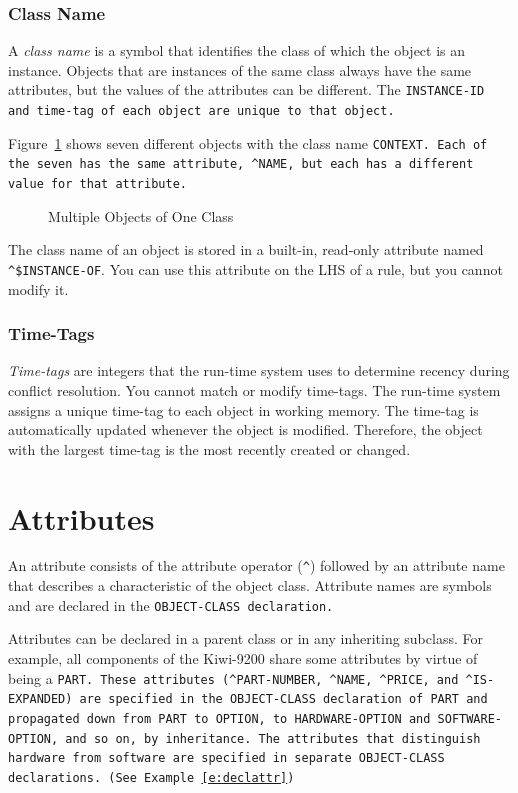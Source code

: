 \subsubsection*{Class Name}

A \emph{class name} is a symbol that identifies the class of which the
object is an instance. Objects that are instances of the same class
always have the same attributes, but the values of the attributes can
be different. The \tt{INSTANCE-ID} and time-tag of each object are
unique to that object.

Figure~\ref{f:2-4} shows seven different objects with the class name
\tt{CONTEXT}. Each of the seven has the same attribute, \verb|^NAME|,
but each has a different value for that attribute.

\begin{figure}[h]
  \centering
  
  \caption{Multiple Objects of One Class}
  \label{f:2-4}
\end{figure}

The class name of an object is stored in a built-in,
read-only attribute named \verb|^$INSTANCE-OF|. You can use this
attribute on the LHS of a rule, but you cannot modify it.

\subsubsection*{Time-Tags}

\emph{Time-tags} are integers that the run-time system uses to
determine recency during conflict resolution. You cannot match or
modify time-tags. The run-time system assigns a unique time-tag to
each object in working memory. The time-tag is automatically updated
whenever the object is modified. Therefore, the object with the
largest time-tag is the most recently created or changed.

\section{Attributes}

An attribute consists of the attribute operator (\verb|^|) followed
by an attribute name that describes a characteristic of the
object class. Attribute names are symbols and are declared in
the \tt{OBJECT-CLASS} declaration.

Attributes can be declared in a parent class or in any
inheriting subclass. For example, all components of the
Kiwi-9200 share some attributes by virtue of being a \tt{PART}.
These attributes (\verb|^PART-NUMBER|, \verb|^NAME|, \verb|^PRICE|, and
\verb|^IS-EXPANDED|) are specified in the \tt{OBJECT-CLASS} declaration
of \tt{PART} and propagated down from \tt{PART} to \tt{OPTION}, to
\tt{HARDWARE-OPTION} and \tt{SOFTWARE-OPTION}, and so on, by
inheritance. The attributes that distinguish hardware from
software are specified in separate \tt{OBJECT-CLASS} declarations.
(See Example~\ref{e:declattr})

